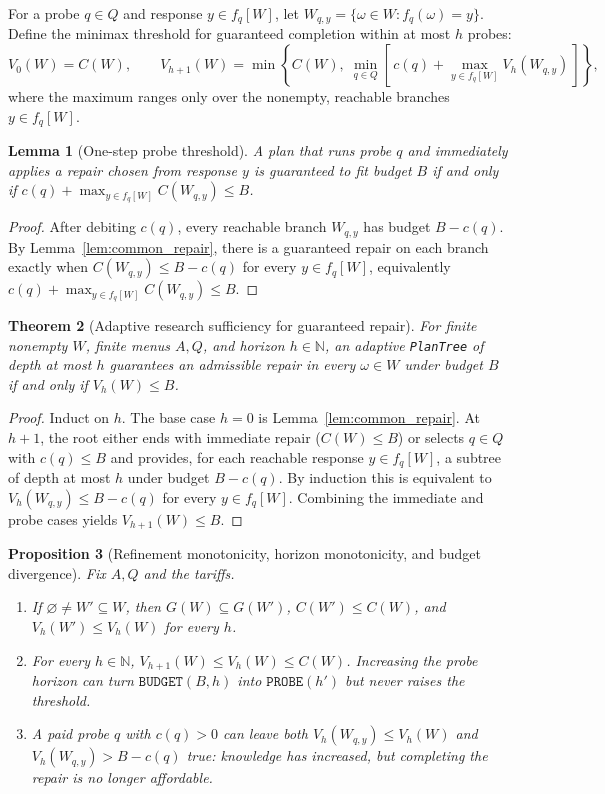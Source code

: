 \documentclass[11pt,a4paper]{article}
\theoremstyle{preprintthm}
\newtheorem{theorem}{Theorem}[section]
\newtheorem{lemma}[theorem]{Lemma}
\newtheorem{proposition}[theorem]{Proposition}
\theoremstyle{preprintdef}
\begin{document}
For a probe $q\in Q$ and response $y\in f_q[W]$, let $W_{q,y}=\{\omega\in W:f_q(\omega)=y\}$. Define the minimax threshold for guaranteed completion within at most $h$ probes:
\begin{equation}
  V_0(W) = C(W),
  \qquad
  V_{h+1}(W) = \min\!\left\{ C(W),\; \min_{q\in Q}\!\left[\, c(q) + \max_{y\in f_q[W]} V_h(W_{q,y}) \,\right] \right\},
\end{equation}
where the maximum ranges only over the nonempty, reachable branches $y\in f_q[W]$.

\begin{lemma}[One-step probe threshold]
\label{lem:one_step}
A plan that runs probe $q$ and immediately applies a repair chosen from response $y$ is guaranteed to fit budget $B$ if and only if $c(q)+\max_{y\in f_q[W]}C(W_{q,y})\le B$.
\end{lemma}
\begin{proof}
After debiting $c(q)$, every reachable branch $W_{q,y}$ has budget $B-c(q)$. By Lemma~\ref{lem:common_repair}, there is a guaranteed repair on each branch exactly when $C(W_{q,y})\le B-c(q)$ for every $y\in f_q[W]$, equivalently $c(q)+\max_{y\in f_q[W]}C(W_{q,y})\le B$.
\end{proof}

\begin{theorem}[Adaptive research sufficiency for guaranteed repair]
\label{thm:minimax_main}
For finite nonempty $W$, finite menus $A,Q$, and horizon $h\in\mathbb N$, an adaptive \texttt{PlanTree} of depth at most $h$ guarantees an admissible repair in every $\omega\in W$ under budget $B$ if and only if $V_h(W)\le B$.
\end{theorem}
\begin{proof}
Induct on $h$. The base case $h=0$ is Lemma~\ref{lem:common_repair}. At $h+1$, the root either ends with immediate repair ($C(W)\le B$) or selects $q\in Q$ with $c(q)\le B$ and provides, for each reachable response $y\in f_q[W]$, a subtree of depth at most $h$ under budget $B-c(q)$. By induction this is equivalent to $V_h(W_{q,y})\le B-c(q)$ for every $y\in f_q[W]$. Combining the immediate and probe cases yields $V_{h+1}(W)\le B$.
\end{proof}

\begin{proposition}[Refinement monotonicity, horizon monotonicity, and budget divergence]
\label{prop:monotonicity}
Fix $A,Q$ and the tariffs.
\begin{enumerate}
  \item If $\varnothing\ne W'\subseteq W$, then $G(W)\subseteq G(W')$, $C(W')\le C(W)$, and $V_h(W')\le V_h(W)$ for every $h$.
  \item For every $h\in\mathbb N$, $V_{h+1}(W)\le V_h(W)\le C(W)$. Increasing the probe horizon can turn $\texttt{BUDGET}(B,h)$ into $\texttt{PROBE}(h')$ but never raises the threshold.
  \item A paid probe $q$ with $c(q)>0$ can leave both $V_h(W_{q,y})\le V_h(W)$ and $V_h(W_{q,y})>B-c(q)$ true: knowledge has increased, but completing the repair is no longer affordable.
\end{enumerate}
\end{proposition}
\end{document}
